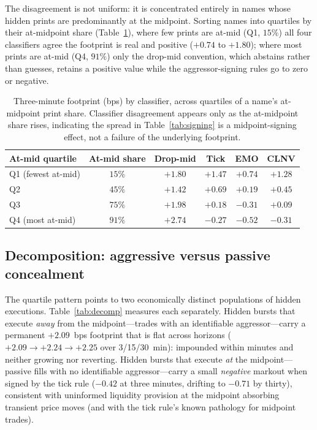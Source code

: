 \documentclass[11pt]{article}
\begin{document}
The disagreement is not uniform: it is concentrated entirely in names whose hidden prints
are predominantly at the midpoint. Sorting names into quartiles by their at-midpoint share
(Table~\ref{tab:signing_quartile}), where few prints are at-mid (Q1, $15\%$) all four
classifiers agree the footprint is real and positive ($+0.74$ to $+1.80$); where most
prints are at-mid (Q4, $91\%$) only the drop-mid convention, which abstains rather than
guesses, retains a positive value while the aggressor-signing rules go to zero or negative.

\begin{table}[htbp]
\centering
\begin{tabular}{lccccc}
\toprule
\textbf{At-mid quartile} & \textbf{At-mid share} & \textbf{Drop-mid} & \textbf{Tick} & \textbf{EMO} & \textbf{CLNV} \\
\midrule
Q1 (fewest at-mid) & $15\%$ & $+1.80$ & $+1.47$ & $+0.74$ & $+1.28$ \\
Q2 & $45\%$ & $+1.42$ & $+0.69$ & $+0.19$ & $+0.45$ \\
Q3 & $75\%$ & $+1.98$ & $+0.18$ & $-0.31$ & $+0.09$ \\
Q4 (most at-mid) & $91\%$ & $+2.74$ & $-0.27$ & $-0.52$ & $-0.31$ \\
\bottomrule
\end{tabular}
\caption{Three-minute footprint (bps) by classifier, across quartiles of a name's
at-midpoint print share. Classifier disagreement appears only as the at-midpoint share
rises, indicating the spread in Table~\ref{tab:signing} is a midpoint-signing effect, not
a failure of the underlying footprint.}
\label{tab:signing_quartile}
\end{table}

\subsection{Decomposition: aggressive versus passive concealment}
\label{sub:decomp}
The quartile pattern points to two economically distinct populations of hidden executions.
Table~\ref{tab:decomp} measures each separately. Hidden bursts that execute \emph{away}
from the midpoint---trades with an identifiable aggressor---carry a permanent
$+2.09$~bps footprint that is flat across horizons ($+2.09 \to +2.24 \to +2.25$ over
3/15/30~min): impounded within minutes and neither growing nor reverting. Hidden bursts
that execute \emph{at} the midpoint---passive fills with no identifiable aggressor---carry
a small \emph{negative} markout when signed by the tick rule ($-0.42$ at three minutes,
drifting to $-0.71$ by thirty), consistent with uninformed liquidity provision at the
midpoint absorbing transient price moves (and with the tick rule's known pathology for
midpoint trades).
\end{document}

